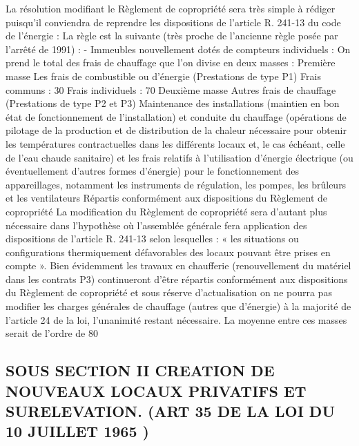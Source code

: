 		La résolution modifiant le Règlement de copropriété sera très simple à rédiger puisqu’il conviendra de reprendre les dispositions de l’article R. 241-13 du code de l’énergie :
		La règle est la suivante (très proche de l’ancienne règle posée par l’arrêté de 1991) :
		- Immeubles nouvellement dotés de compteurs individuels :
		On prend le total des frais de chauffage que l’on divise en deux masses :
		Première masse
		Les frais de combustible ou d’énergie (Prestations de type P1)
		Frais communs : 30 %
		Frais individuels : 70 %
		Deuxième masse
		Autres frais de chauffage (Prestations de type P2 et P3)
		Maintenance des installations (maintien en bon état de fonctionnement de l’installation) et conduite du chauffage (opérations de pilotage de la production et de distribution de la chaleur nécessaire pour obtenir les températures contractuelles dans les différents locaux et, le cas échéant, celle de l’eau chaude sanitaire) et les frais relatifs à l'utilisation d'énergie électrique (ou éventuellement d'autres formes d'énergie)
		pour le fonctionnement des appareillages, notamment les instruments de régulation, les pompes, les brûleurs et les ventilateurs
		Répartis conformément aux dispositions du Règlement de copropriété
		La modification du Règlement de copropriété sera d’autant plus nécessaire dans l’hypothèse où l’assemblée générale fera application des dispositions de l’article R. 241-13 selon lesquelles : « les situations ou configurations thermiquement défavorables des locaux pouvant être prises en compte ».
		Bien évidemment les travaux en chaufferie (renouvellement du matériel dans les contrats P3) continueront d’être répartis conformément aux dispositions du Règlement de copropriété et sous réserve d’actualisation on ne pourra pas modifier les charges générales de chauffage (autres que d’énergie) à la majorité de l’article 24 de la loi, l’unanimité restant nécessaire.
		La moyenne entre ces masses serait de l’ordre de 80 %
	
	\subsection{SOUS SECTION II CREATION DE NOUVEAUX LOCAUX PRIVATIFS ET SURELEVATION. (ART 35 DE LA LOI DU 10 JUILLET 1965 )}
	

